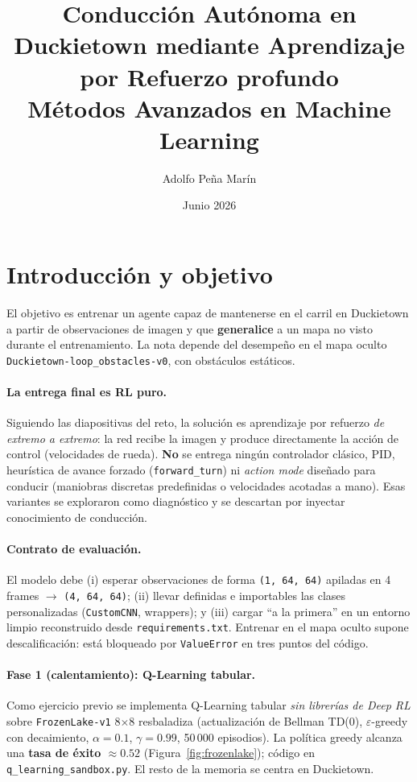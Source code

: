 \documentclass[11pt,a4paper]{article}
\title{\textbf{Conducción Autónoma en Duckietown mediante Aprendizaje por Refuerzo profundo}\\[4pt]
\large Métodos Avanzados en Machine Learning}
\author{Adolfo Peña Marín}
\date{Junio 2026}
\newcommand{\code}[1]{\texttt{#1}}
\begin{document}
\maketitle

\section{Introducción y objetivo}
El objetivo es entrenar un agente capaz de mantenerse en el carril en Duckietown a partir
de observaciones de imagen y que \textbf{generalice} a un mapa no visto durante el
entrenamiento. La nota depende del desempeño en el mapa oculto
\code{Duckietown-loop\_obstacles-v0}, con obstáculos estáticos.

\paragraph{La entrega final es RL puro.} Siguiendo las diapositivas del reto, la solución
es aprendizaje por refuerzo \emph{de extremo a extremo}: la red recibe la imagen y produce
directamente la acción de control (velocidades de rueda). \textbf{No} se entrega ningún
controlador clásico, PID, heurística de avance forzado (\code{forward\_turn}) ni
\emph{action mode} diseñado para conducir (maniobras discretas predefinidas o velocidades
acotadas a mano). Esas variantes se exploraron como diagnóstico y se descartan por inyectar
conocimiento de conducción.

\paragraph{Contrato de evaluación.} El modelo debe (i) esperar observaciones de forma
\code{(1, 64, 64)} apiladas en 4 frames $\rightarrow$ \code{(4, 64, 64)}; (ii) llevar
definidas e importables las clases personalizadas (\code{CustomCNN}, wrappers); y (iii)
cargar ``a la primera'' en un entorno limpio reconstruido desde \code{requirements.txt}.
Entrenar en el mapa oculto supone descalificación: está bloqueado por \code{ValueError} en
tres puntos del código.

\paragraph{Fase 1 (calentamiento): Q-Learning tabular.} Como ejercicio previo se implementa
Q-Learning tabular \emph{sin librerías de Deep RL} sobre \code{FrozenLake-v1} 8$\times$8
resbaladiza (actualización de Bellman TD(0), $\varepsilon$-greedy con decaimiento,
$\alpha=0.1$, $\gamma=0.99$, 50\,000 episodios). La política greedy alcanza una
\textbf{tasa de éxito $\approx 0.52$} (Figura~\ref{fig:frozenlake}); código en
\code{q\_learning\_sandbox.py}. El resto de la memoria se centra en Duckietown.
\end{document}
